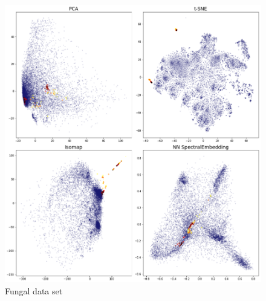 \begin{figure}[!htbp]
\begin{minipage}{7in}\centering\includegraphics[width = 6.5in]{figure004.png}\end{minipage}
\caption{\label{figure004}
Fungal data set
}\end{figure}


